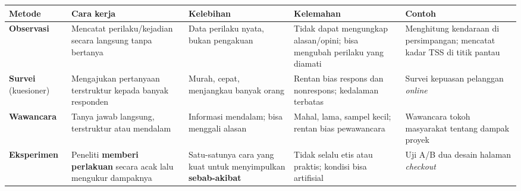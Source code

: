 \documentclass[
  indonesian,
  letterpaper,
]{book}
\newcounter{none} %
\begin{document}
{\def\LTcaptype{none} %
\begin{longtable}[]{@{}
  >{\raggedright\arraybackslash}p{}
  >{\raggedright\arraybackslash}p{}
  >{\raggedright\arraybackslash}p{}
  >{\raggedright\arraybackslash}p{}
  >{\raggedright\arraybackslash}p{}@{}}
\toprule\noalign{}
\begin{minipage}[b]{\linewidth}\raggedright
Metode
\end{minipage} & \begin{minipage}[b]{\linewidth}\raggedright
Cara kerja
\end{minipage} & \begin{minipage}[b]{\linewidth}\raggedright
Kelebihan
\end{minipage} & \begin{minipage}[b]{\linewidth}\raggedright
Kelemahan
\end{minipage} & \begin{minipage}[b]{\linewidth}\raggedright
Contoh
\end{minipage} \\
\midrule\noalign{}
\endhead
\bottomrule\noalign{}
\endlastfoot
\textbf{Observasi} & Mencatat perilaku/kejadian secara langsung tanpa
bertanya & Data perilaku nyata, bukan pengakuan & Tidak dapat mengungkap
alasan/opini; bisa mengubah perilaku yang diamati & Menghitung kendaraan
di persimpangan; mencatat kadar TSS di titik pantau \\
\textbf{Survei} (kuesioner) & Mengajukan pertanyaan terstruktur kepada
banyak responden & Murah, cepat, menjangkau banyak orang & Rentan bias
respons dan nonrespons; kedalaman terbatas & Survei kepuasan pelanggan
\emph{online} \\
\textbf{Wawancara} & Tanya jawab langsung, terstruktur atau mendalam &
Informasi mendalam; bisa menggali alasan & Mahal, lama, sampel kecil;
rentan bias pewawancara & Wawancara tokoh masyarakat tentang dampak
proyek \\
\textbf{Eksperimen} & Peneliti \textbf{memberi perlakuan} secara acak
lalu mengukur dampaknya & Satu-satunya cara yang kuat untuk menyimpulkan
\textbf{sebab-akibat} & Tidak selalu etis atau praktis; kondisi bisa
artifisial & Uji A/B dua desain halaman \emph{checkout} \\
\end{longtable}
}
\end{document}
